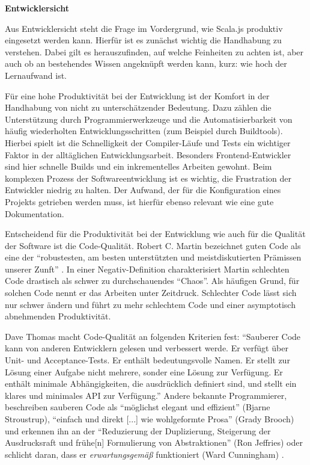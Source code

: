 \documentclass[a4paper, 12pt, hidelinks, listof=totoc, listoftables=totoc, bibliography=totoc]{scrreprt}
\newcommand{\MyMiniSec}[1]{\rmfamily\fontsize{12}{15}\selectfont
	\vspace{7pt}\textbf{#1} %
}
\begin{document}
\MyMiniSec{Entwicklersicht}

Aus Entwicklersicht steht die Frage im Vordergrund, wie Scala.js produktiv eingesetzt werden kann. Hierfür ist es zunächst wichtig die Handhabung zu verstehen. Dabei gilt es herauszufinden, auf welche Feinheiten zu achten ist, aber auch ob an bestehendes Wissen angeknüpft werden kann, kurz: wie hoch der Lernaufwand ist.

Für eine hohe Produktivität bei der Entwicklung ist der Komfort in der Handhabung von nicht zu unterschätzender Bedeutung. Dazu zählen die Unterstützung durch Programmierwerkzeuge und die Automatisierbarkeit von häufig wiederholten Entwicklungsschritten (zum Beispiel durch Buildtools). Hierbei spielt ist die Schnelligkeit der Compiler-Läufe und Tests ein wichtiger Faktor in der alltäglichen Entwicklungsarbeit. Besonders Frontend-Entwickler sind hier schnelle Builds und ein inkrementelles Arbeiten gewohnt. Beim komplexen Prozess der Softwareentwicklung ist es wichtig, die Frustration der Entwickler niedrig zu halten. Der Aufwand, der für die Konfiguration eines Projekts getrieben werden muss, ist hierfür ebenso relevant wie eine gute Dokumentation.

Entscheidend für die Produktivität bei der Entwicklung wie auch für die Qualität der Software ist die Code-Qualität. Robert C. Martin bezeichnet guten Code als eine der "`robustesten, am besten unterstützten und meistdiskutierten Prämissen unserer Zunft"' \cite[S. 27]{martin2009.CCH}. In einer Negativ-Definition charakterisiert Martin schlechten Code drastisch als schwer zu durchschauendes "`Chaos"'. Als häufigen Grund, für solchen Code nennt er das Arbeiten unter Zeitdruck. Schlechter Code lässt sich nur schwer ändern und führt zu mehr schlechtem Code und einer asymptotisch abnehmenden Produktivität. \cite[S. 27 f.]{martin2009.CCH}

Dave Thomas macht Code-Qualität an folgenden Kriterien fest: "`Sauberer Code kann von anderen Entwicklern gelesen und verbessert werde. Er verfügt über Unit- und Acceptance-Tests. Er enthält bedeutungsvolle Namen. Er stellt zur Lösung einer Aufgabe nicht mehrere, sonder eine Lösung zur Verfügung. Er enthält minimale Abhängigkeiten, die ausdrücklich definiert sind, und stellt ein klares und minimales API zur Verfügung."' \cite[zit. nach: ][S. 35]{martin2009.CCH} Andere bekannte Programmierer, beschreiben sauberen Code als "`möglichst elegant und effizient"' (Bjarne Stroustrup), "`einfach und direkt [...] wie wohlgeformte Prosa"' (Grady Brooch) und erkennen ihn an der "`Reduzierung der Duplizierung, Steigerung der Ausdrucksraft und frühe[n] Formulierung von Abstraktionen"' (Ron Jeffries) oder schlicht daran, dass er \emph{erwartungsgemäß} funktioniert (Ward Cunningham) \cite[alle zit. nach: ][S. 32 ff.]{martin2009.CCH}.
\end{document}
